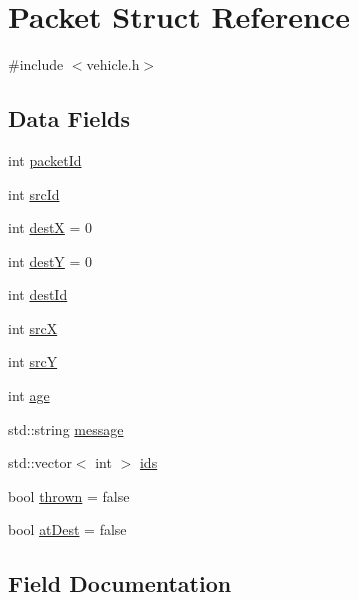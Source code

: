 \hypertarget{struct_packet}{}\section{Packet Struct Reference}
\label{struct_packet}


{\ttfamily \#include $<$vehicle.\+h$>$}

\subsection*{Data Fields}
\begin{DoxyCompactItemize}
\item 
int \hyperlink{struct_packet_aae6c808e4b78bd0b7132d304eaaed11a}{packet\+Id}
\item 
int \hyperlink{struct_packet_a49ad0fa6d01cef616890e7600738347f}{src\+Id}
\item 
int \hyperlink{struct_packet_ab7e35436e4e613479fae8e00ca3c5e67}{destX} = 0
\item 
int \hyperlink{struct_packet_a261c41f20f9f63c178db8d11f0b75c02}{destY} = 0
\item 
int \hyperlink{struct_packet_a874f1ca82309f2bd71c50cb3cc8ef6da}{dest\+Id}
\item 
int \hyperlink{struct_packet_a4914e635f21d35be79e49f120a7c0a58}{srcX}
\item 
int \hyperlink{struct_packet_a602f69d786a518061ec0f10a062f238f}{srcY}
\item 
int \hyperlink{struct_packet_a42bdb1adc39f80fac600ceecc9dd4fb5}{age}
\item 
std\+::string \hyperlink{struct_packet_a0e7b672745479c3246c495020baefb37}{message}
\item 
std\+::vector$<$ int $>$ \hyperlink{struct_packet_a0a31a723ea909e09df5ad91ab6cae52a}{ids}
\item 
bool \hyperlink{struct_packet_a038e9272912182b7489c2b972c360267}{thrown} = false
\item 
bool \hyperlink{struct_packet_aff40251851843edda40aeaab9bf1f53e}{at\+Dest} = false
\end{DoxyCompactItemize}


\subsection{Field Documentation}
\hypertarget{struct_packet_a42bdb1adc39f80fac600ceecc9dd4fb5}{}\label{struct_packet_a42bdb1adc39f80fac600ceecc9dd4fb5} 

